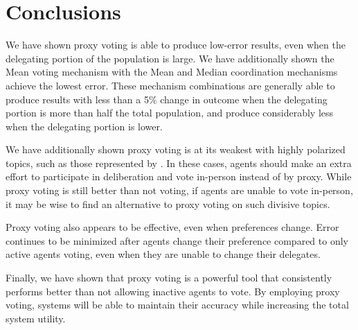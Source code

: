 \section{Conclusions}\label{sec:conclusions}
We have shown proxy voting is able to produce low-error results, even when the
delegating portion of the population is large.
We have additionally shown the Mean voting mechanism with the Mean and Median
coordination mechanisms achieve the lowest error.
These mechanism combinations are generally able to produce results with less than a 5\%
change in outcome when the delegating portion is more than half the total
population, and produce considerably less when the delegating portion is lower.

We have additionally shown proxy voting is at its weakest with highly polarized
topics, such as those represented by .
In these cases, agents should make an extra effort to participate in deliberation and
vote in-person instead of by proxy.
While proxy voting is still better than not voting, if agents are unable to vote
in-person, it may be wise to find an alternative to proxy voting on such divisive
topics.  

Proxy voting also appears to be effective, even when preferences change.
Error continues to be minimized after agents change their preference compared to only
active agents voting, even when they are unable to change their delegates.

Finally, we have shown that proxy voting is a powerful tool that consistently
performs better than not allowing inactive agents to vote.
By employing proxy voting, systems will be able to maintain their accuracy while
increasing the total system utility.

